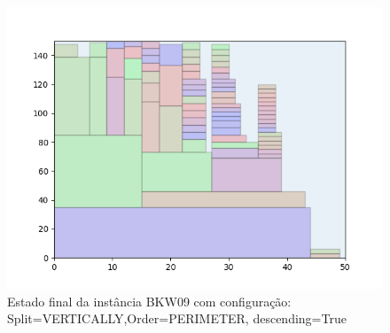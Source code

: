 \begin{figure}[H]
    \centering
    \caption[]{Estado final da instância BKW09 com configuração: Split=VERTICALLY,Order=PERIMETER, descending=True}
    \label{fig:bkw09-vertically-perimeter-true}
    \includegraphics[scale=0.5]{output/figures/bkw/bkw09/vertically/perimeter/true/000}
\end{figure}